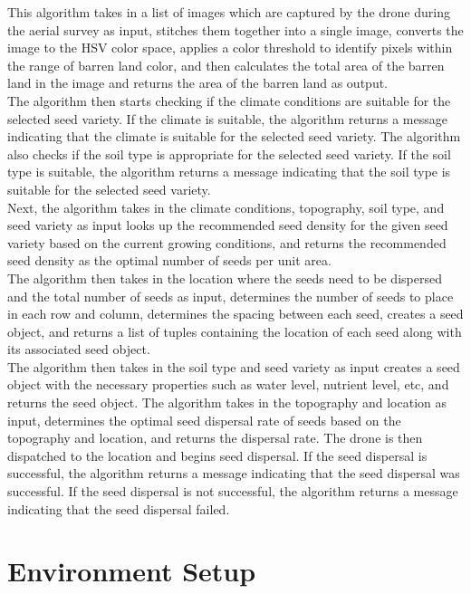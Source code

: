 \documentclass[pmlr,twocolumn,10pt]{jmlr}
\begin{document}
 This algorithm takes in a list of images which are captured by the drone during the aerial survey as input, stitches them together into a single image, converts the image to the HSV color space, applies a color threshold to identify pixels within the range of barren land color, and then calculates the total area of the barren land in the image and returns the area of the barren land as output.
 \\The algorithm then starts checking if the climate conditions are suitable for the selected seed variety. If the climate is suitable, the algorithm returns a message indicating that the climate is suitable for the selected seed variety. The algorithm also checks if the soil type is appropriate for the selected seed variety. If the soil type is suitable, the algorithm returns a message indicating that the soil type is suitable for the selected seed variety.
\\Next, the algorithm takes in the climate conditions, topography, soil type, and seed variety as input looks up the recommended seed density for the given seed variety based on the current growing conditions, and returns the recommended seed density as the optimal number of seeds per unit area. 
\\The algorithm then takes in the location where the seeds need to be dispersed and the total number of seeds as input, determines the number of seeds to place in each row and column, determines the spacing between each seed, creates a seed object, and returns a list of tuples containing the location of each seed along with its associated seed object. 
\\The algorithm then takes in the soil type and seed variety as input creates a seed object with the necessary properties such as water level, nutrient level, etc, and returns the seed object. The algorithm takes in the topography and location as input, determines the optimal seed dispersal rate of seeds based on the topography and location, and returns the dispersal rate. The drone is then dispatched to the location and begins seed dispersal. If the seed dispersal is successful, the algorithm returns a message indicating that the seed dispersal was successful. If the seed dispersal is not successful, the algorithm returns a message indicating that the seed dispersal failed.

\section{Environment Setup}
\end{document}
